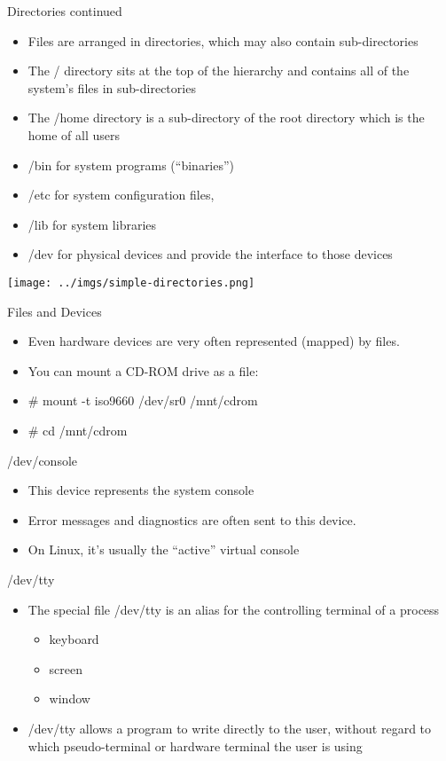 \documentclass{beamer}
\begin{document}
\begin{frame}{Directories continued}
\begin{itemize}
\item Files are arranged in directories, which may also contain sub-directories
\item The / directory sits at the top of the hierarchy and contains all of the system's files in sub-directories
\item The /home directory is a sub-directory of the root directory which is the home of all users
\item /bin for system programs (``binaries'')
\item /etc for system configuration files,
\item /lib for system libraries
\item /dev for physical devices and provide the interface to those devices
\end{itemize}
\end{frame}

\begin{frame}{}
\texttt{[image: ../imgs/simple-directories.png]}
\end{frame}

\begin{frame}{Files and Devices}
\begin{itemize}
\item Even hardware devices are very often represented (mapped) by files.
\item You can mount a CD-ROM drive as a file:
\item \# mount -t iso9660 /dev/sr0 /mnt/cdrom
\item \# cd /mnt/cdrom
\end{itemize}
\end{frame}

\begin{frame}{/dev/console}
\begin{itemize}
\item This device represents the system console
\item Error messages and diagnostics are often sent to this device.
\item On Linux, it's usually the ``active'' virtual console
\end{itemize}
\end{frame}

\begin{frame}{/dev/tty}
\begin{itemize}
\item The special file /dev/tty is an alias for the controlling terminal of a process
\begin{itemize}
\item keyboard
\item screen
\item window
\end{itemize}
\item /dev/tty allows a program to write directly to the user, without regard to which pseudo-terminal or hardware terminal the user is using
\end{itemize}
\end{frame}
\end{document}
